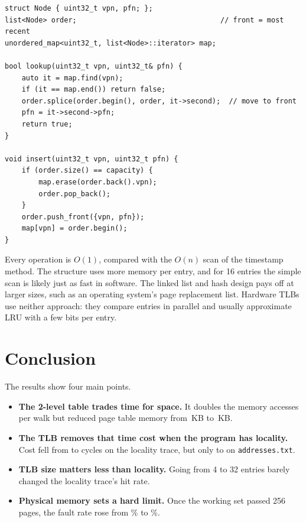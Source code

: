 \documentclass[11pt]{article}
\newcommand{\code}[1]{\texttt{#1}}
\begin{document}
\begin{lstlisting}
struct Node { uint32_t vpn, pfn; };
list<Node> order;                                  // front = most recent
unordered_map<uint32_t, list<Node>::iterator> map;

bool lookup(uint32_t vpn, uint32_t& pfn) {
    auto it = map.find(vpn);
    if (it == map.end()) return false;
    order.splice(order.begin(), order, it->second);  // move to front
    pfn = it->second->pfn;
    return true;
}

void insert(uint32_t vpn, uint32_t pfn) {
    if (order.size() == capacity) {
        map.erase(order.back().vpn);
        order.pop_back();
    }
    order.push_front({vpn, pfn});
    map[vpn] = order.begin();
}
\end{lstlisting}

Every operation is $O(1)$, compared with the $O(n)$ scan of the timestamp method.
The structure uses more memory per entry, and for 16 entries the simple scan is
likely just as fast in software. The linked list and hash design pays off at larger
sizes, such as an operating system's page replacement list. Hardware TLBs use
neither approach: they compare entries in parallel and usually approximate LRU
with a few bits per entry.

\section{Conclusion}

The results show four main points.
\begin{itemize}
  \item \textbf{The 2-level table trades time for space.} It doubles the memory
  accesses per walk but reduced page table memory from \FlatKB{}\,KB to
  \TwoLevelKB{}\,KB.
  \item \textbf{The TLB removes that time cost when the program has locality.}
  Cost fell from \LocalBaseCycles{} to \LocalCycles{} cycles on the locality trace,
  but only to \AvgCycles{} on \code{addresses.txt}.
  \item \textbf{TLB size matters less than locality.} Going from 4 to 32 entries
  barely changed the locality trace's hit rate.
  \item \textbf{Physical memory sets a hard limit.} Once the working set passed 256
  pages, the fault rate rose from \FaultRateFits\% to \FaultRateDouble\%.
\end{itemize}
\end{document}
